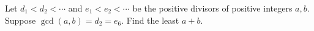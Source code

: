 Let $d_1<d_2<\cdots$ and $e_1<e_2<\cdots$ be the positive divisors of positive integers $a,b$. Suppose $\gcd(a,b)=d_2=e_6$. Find the least $a+b$.
